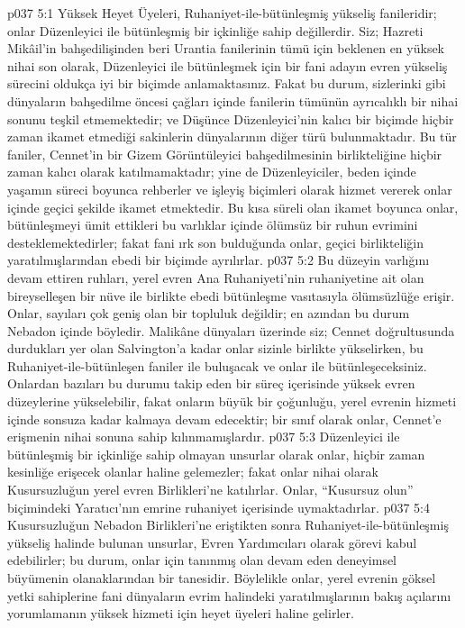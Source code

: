 \vs p037 5:1 Yüksek Heyet Üyeleri, Ruhaniyet\hyp{}ile\hyp{}bütünleşmiş yükseliş fanileridir; onlar Düzenleyici ile bütünleşmiş bir içkinliğe sahip değillerdir. Siz; Hazreti Mikâil’in bahşedilişinden beri Urantia fanilerinin tümü için beklenen en yüksek nihai son olarak, Düzenleyici ile bütünleşmek için bir fani adayın evren yükseliş sürecini oldukça iyi bir biçimde anlamaktasınız. Fakat bu durum, sizlerinki gibi dünyaların bahşedilme öncesi çağları içinde fanilerin tümünün ayrıcalıklı bir nihai sonunu teşkil etmemektedir; ve Düşünce Düzenleyici’nin kalıcı bir biçimde hiçbir zaman ikamet etmediği sakinlerin dünyalarının diğer türü bulunmaktadır. Bu tür faniler, Cennet’in bir Gizem Görüntüleyici bahşedilmesinin birlikteliğine hiçbir zaman kalıcı olarak katılmamaktadır; yine de Düzenleyiciler, beden içinde yaşamın süreci boyunca rehberler ve işleyiş biçimleri olarak hizmet vererek onlar içinde geçici şekilde ikamet etmektedir. Bu kısa süreli olan ikamet boyunca onlar, bütünleşmeyi ümit ettikleri bu varlıklar içinde ölümsüz bir ruhun evrimini desteklemektedirler; fakat fani ırk son bulduğunda onlar, geçici birlikteliğin yaratılmışlarından ebedi bir biçimde ayrılırlar.
\vs p037 5:2 Bu düzeyin varlığını devam ettiren ruhları, yerel evren Ana Ruhaniyeti’nin ruhaniyetine ait olan bireyselleşen bir nüve ile birlikte ebedi bütünleşme vasıtasıyla ölümsüzlüğe erişir. Onlar, sayıları çok geniş olan bir topluluk değildir; en azından bu durum Nebadon içinde böyledir. Malikâne dünyaları üzerinde siz; Cennet doğrultusunda durdukları yer olan Salvington’a kadar onlar sizinle birlikte yükselirken, bu Ruhaniyet\hyp{}ile\hyp{}bütünleşen faniler ile buluşacak ve onlar ile bütünleşeceksiniz. Onlardan bazıları bu durumu takip eden bir süreç içerisinde yüksek evren düzeylerine yükselebilir, fakat onların büyük bir çoğunluğu, yerel evrenin hizmeti içinde sonsuza kadar kalmaya devam edecektir; bir sınıf olarak onlar, Cennet’e erişmenin nihai sonuna sahip kılınmamışlardır.
\vs p037 5:3 Düzenleyici ile bütünleşmiş bir içkinliğe sahip olmayan unsurlar olarak onlar, hiçbir zaman kesinliğe erişecek olanlar haline gelemezler; fakat onlar nihai olarak Kusursuzluğun yerel evren Birlikleri’ne katılırlar. Onlar, “Kusursuz olun” biçimindeki Yaratıcı’nın emrine ruhaniyet içerisinde uymaktadırlar.
\vs p037 5:4 Kusursuzluğun Nebadon Birlikleri’ne eriştikten sonra Ruhaniyet\hyp{}ile\hyp{}bütünleşmiş yükseliş halinde bulunan unsurlar, Evren Yardımcıları olarak görevi kabul edebilirler; bu durum, onlar için tanınmış olan devam eden deneyimsel büyümenin olanaklarından bir tanesidir. Böylelikle onlar, yerel evrenin göksel yetki sahiplerine fani dünyaların evrim halindeki yaratılmışlarının bakış açılarını yorumlamanın yüksek hizmeti için heyet üyeleri haline gelirler.

